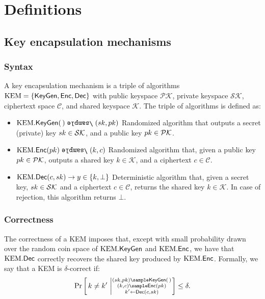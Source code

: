 \section{Definitions}\label{sec:prelims}

\subsection{Key encapsulation mechanisms}\label{sec:kems}

\subsubsection{Syntax}

\begin{definition}
    \label{def:kem}
    A key encapsulation mechanism is a triple of algorithms $\text{KEM} =
    \{\textsf{KeyGen}, \textsf{Enc}, \textsf{Dec}\}$ with public keyspace $\mathcal{PK}$, private
    keyspace $\mathcal{SK}$, ciphertext space $\mathcal{C}$, and shared
    keyspace $\mathcal{K}$.
    The triple of algorithms is defined as:
    \begin{itemize}
    \item $\kem.\keygen(\, )\rsample (\sk, \pk)$ Randomized algorithm that
        outputs a secret (private) key $sk \in \mathcal{SK}$, and a public
        key $pk \in \mathcal{PK}$.
    \item $\kem.\enc(\pk)\rsample (k, c)$ Randomized algorithm that, given a
        public key $pk \in \mathcal{PK}$, outputs a shared key $k \in
        \mathcal{K}$, and a ciphertext $c \in \mathcal{C}$.
    \item $\text{KEM}.\textsf{Dec}(c, sk)\rightarrow y \in \{k, \bot\}$ Deterministic
        algorithm that, given a secret key, $sk \in \mathcal{SK}$ and a
        ciphertext $c \in \mathcal{C}$, returns the shared key $k \in
        \mathcal{K}$.
        In case of rejection, this algorithm returns $\bot$.
    \end{itemize}
\end{definition}


\subsubsection{Correctness}\label{sec:kem-correctness}
%
The correctness  of a KEM imposes  that, except with small  probability drawn
over the  random coin space of  $\text{KEM}.\textsf{KeyGen}$ and $\text{KEM}.\textsf{Enc}$, we  have that
$\text{KEM}.\textsf{Dec}$ correctly recovers the shared key produced by $\text{KEM}.\textsf{Enc}$.
%
Formally, we say that a KEM is $\delta$-correct if:
\[
    \Pr \left[\,  k \ne k' \, \left | \substack{(\sk, \pk) \sample \keygen(\,) \\ (k, c) \sample \enc(\pk) \\ k' \gets \dec(c, \sk) } \right. \right] \le \delta .
\]


